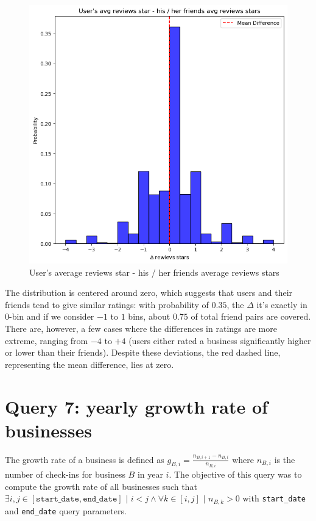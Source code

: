 \documentclass{Configuration_Files/PoliMi3i_thesis}
\begin{document}
\begin{figure}[H]
    \centering
    \includegraphics[width=2\columnwidth / 3]{imgs/query_6.png}
    \caption{User's average reviews star - his / her friends average reviews stars}
    \label{fig:query_6}
\end{figure}

\bigskip

The distribution is centered around zero, which suggests that users and their friends tend to give similar ratings: with probability of $0.35$, the $\Delta$ it's exactly in $0$-bin and if we consider $-1$ to $1$ bins, about $0.75$ of total friend pairs are covered. There are, however, a few cases where the differences in ratings are more extreme, ranging from $-4$ to $+4$ (users either rated a business significantly higher or lower than their friends). Despite these deviations, the red dashed line, representing the mean difference, lies at zero. 

\section{Query 7: yearly growth rate of businesses}
The growth rate of a business is defined as $g_{B, i}=\frac{n_{B, i + 1} - n_{B, i}}{n_{B, i}}$ where $n_{B, i}$ is the number of check-ins for business $B$ in year $i$. The objective of this query was to compute the growth rate of all businesses such that $\exists i, j \in [\texttt{start\_date}, \texttt{end\_date}] \,\, | \,\, i < j \land \forall k \in [i, j] \,\, | \,\, n_{B, k} > 0$ with \texttt{start\_date} and \texttt{end\_date} query parameters.
\end{document}
